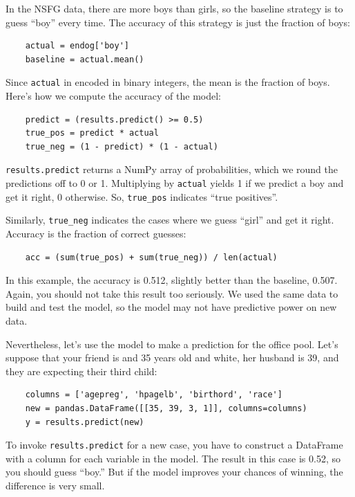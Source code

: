\documentclass[12pt]{book}
\begin{document}
In the NSFG data, there are more boys than girls, so the baseline
strategy is to guess ``boy'' every time.  The accuracy of this
strategy is just the fraction of boys:

\begin{verbatim}
    actual = endog['boy']
    baseline = actual.mean()
\end{verbatim}

Since {\tt actual} in encoded in binary integers, the mean is the
fraction of boys.  Here's how we compute the accuracy of the model:

\begin{verbatim}
    predict = (results.predict() >= 0.5)
    true_pos = predict * actual
    true_neg = (1 - predict) * (1 - actual)
\end{verbatim}

{\tt results.predict} returns a NumPy array of probabilities, which we
round the predictions off to 0 or 1.  Multiplying by {\tt actual}
yields 1 if we predict a boy and get it right, 0 otherwise.  So,
\verb"true_pos" indicates ``true positives''.

Similarly, \verb"true_neg" indicates the cases where we guess ``girl''
and get it right.  Accuracy is the fraction of correct guesses:

\begin{verbatim}
    acc = (sum(true_pos) + sum(true_neg)) / len(actual)
\end{verbatim}

In this example, the accuracy is 0.512, slightly better than the
baseline, 0.507.  Again, you should not take this result too seriously.
We used the same data to build and test the model, so the model
may not have predictive power on new data.

Nevertheless, let's use the model to make a prediction for the office
pool.  Let's suppose that your friend is and 35 years old and white,
her husband is 39, and they are expecting their third child:

\begin{verbatim}
    columns = ['agepreg', 'hpagelb', 'birthord', 'race']
    new = pandas.DataFrame([[35, 39, 3, 1]], columns=columns)
    y = results.predict(new)
\end{verbatim}

To invoke {\tt results.predict} for a new case, you have to construct
a DataFrame with a column for each variable in the model.  The result
in this case is 0.52, so you should guess ``boy.''  But if the model
improves your chances of winning, the difference is very small.
\end{document}

